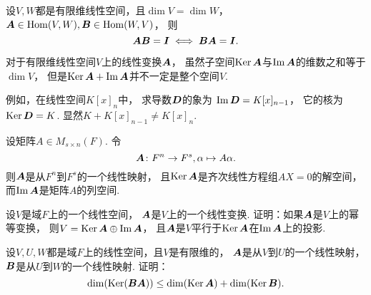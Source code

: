 \begin{proposition}
设\(V,W\)都是有限维线性空间，且\(\dim V = \dim W\)，
\(\boldsymbol{A}\in\operatorname{Hom}(V,W),
\boldsymbol{B}\in\operatorname{Hom}(W,V)\)，
则\begin{equation*}
	\boldsymbol{A}\boldsymbol{B} = \boldsymbol{I}
	\iff
	\boldsymbol{B}\boldsymbol{A} = \boldsymbol{I}.
\end{equation*}
\end{proposition}

\begin{remark}
对于有限维线性空间\(V\)上的线性变换\(\boldsymbol{A}\)，
虽然子空间\(\operatorname{Ker}\boldsymbol{A}\)与\(\operatorname{Im}\boldsymbol{A}\)的维数之和等于\(\dim V\)，
但是\(\operatorname{Ker}\boldsymbol{A}+\operatorname{Im}\boldsymbol{A}\)并不一定是整个空间\(V\).

例如，在线性空间\(K[x]_n\)中，
求导数\(\boldsymbol{D}\)的象为
\(\operatorname{Im}\boldsymbol{D}=K[x]_{n-1}\)，
它的核为\(\operatorname{Ker}\boldsymbol{D}=K\).
显然\(K+K[x]_{n-1}\neq K[x]_n\).
\end{remark}

\begin{example}
设矩阵\(A \in M_{s \times n}(F)\).
令\begin{equation*}
	\boldsymbol{A}\colon F^n \to F^s, \alpha \mapsto A\alpha.
\end{equation*}
则\(\boldsymbol{A}\)是从\(F^n\)到\(F^s\)的一个线性映射，
且\(\operatorname{Ker}\boldsymbol{A}\)是齐次线性方程组\(AX=0\)的解空间，
而\(\operatorname{Im}\boldsymbol{A}\)是矩阵\(A\)的列空间.
\end{example}

\begin{example}
设\(V\)是域\(F\)上的一个线性空间，
\(\boldsymbol{A}\)是\(V\)上的一个线性变换.
证明：如果\(\boldsymbol{A}\)是\(V\)上的幂等变换，
则\(V = \operatorname{Ker}\boldsymbol{A} \oplus \operatorname{Im}\boldsymbol{A}\)，
且\(\boldsymbol{A}\)是\(V\)平行于\(\operatorname{Ker}\boldsymbol{A}\)在\(\operatorname{Im}\boldsymbol{A}\)上的投影.
\end{example}

\begin{example}
设\(V,U,W\)都是域\(F\)上的线性空间，且\(V\)是有限维的，
\(\boldsymbol{A}\)是从\(V\)到\(U\)的一个线性映射，
\(\boldsymbol{B}\)是从\(U\)到\(W\)的一个线性映射.
证明：\begin{equation*}
	\dim(\operatorname{Ker}(\boldsymbol{B}\boldsymbol{A}))
	\leq
	\dim(\operatorname{Ker}\boldsymbol{A})
	+ \dim(\operatorname{Ker}\boldsymbol{B}).
\end{equation*}
\end{example}

